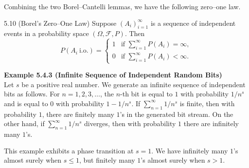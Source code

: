 Combining the two Borel--Cantelli lemmas, we have the following zero--one law.

\begin{thmbox}{5.10 (Borel's Zero--One Law)}
Suppose $(A_i)_{i=1}^{\infty}$ is a sequence of independent events in a probability space $(\Omega,\mathcal{F},P)$. Then
\[
P(A_i\ \text{i.o.})=
\begin{cases}
1 & \text{if } \sum_{i=1}^{\infty} P(A_i)=\infty,\\
0 & \text{if } \sum_{i=1}^{\infty} P(A_i)<\infty.
\end{cases}
\]
\end{thmbox}

\textbf{Example 5.4.3 (Infinite Sequence of Independent Random Bits)} \\
Let $s$ be a positive real number. We generate an infinite sequence of independent bits as follows. For $n=1,2,3,\ldots$, the $n$-th bit is equal to $1$ with probability $1/n^s$ and is equal to $0$ with probability $1-1/n^s$. If $\sum_{n=1}^{\infty} 1/n^s$ is finite, then with probability $1$, there are finitely many $1$'s in the generated bit stream. On the other hand, if $\sum_{n=1}^{\infty} 1/n^s$ diverges, then with probability $1$ there are infinitely many $1$'s.

This example exhibits a phase transition at $s=1$. We have infinitely many $1$'s almost surely when $s \le 1$, but finitely many $1$'s almost surely when $s>1$.
